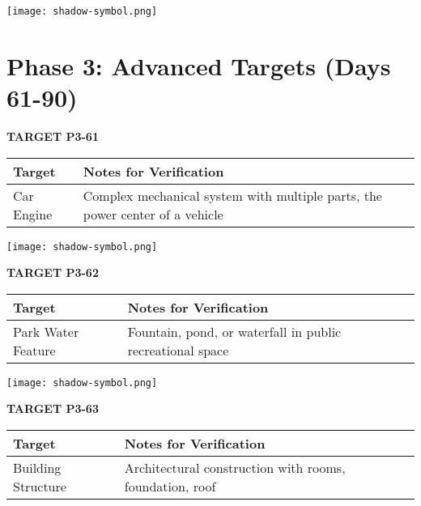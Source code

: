 \documentclass[10pt,twoside,final]{book} %
\makeatletter
\newcommand{\cleardoublepageWithSymbol}{%
  \clearpage %
  \if@twoside %
    \ifodd\c@page %
    \else %
      \thispagestyle{fancy} %
      \begingroup %
        \vspace*{0pt} %
        \vfill %
        \centering %
        \noindent 
        \texttt{[image: shadow-symbol.png]}
        \vfill %
      \endgroup
      \newpage    %
      \if@twocolumn\if@firstcolumn\else\hbox{}\newpage\fi\fi
    \fi
  \fi
}
\makeatother
\begin{document}
\cleardoublepageWithSymbol

\section*{Phase 3: Advanced Targets (Days 61-90)}

\label{target:P3-61}
\begin{center}
\Large\textbf{TARGET P3-61}
\end{center}
\begin{mdframed}[backgroundcolor=white, linewidth=0.7pt, linecolor=rvprimary, shadow=true, shadowsize=1pt, shadowcolor=graydark!40, roundcorner=3pt]
\begin{tabular}{|p{3.5cm}|p{9cm}|}
\hline
\rowcolor{rvprimary!15}
\textbf{Target} & \textbf{Notes for Verification} \\
\hline
Car Engine & Complex mechanical system with multiple parts, the power center of a vehicle \\
\hline
\end{tabular}
\end{mdframed}


\cleardoublepageWithSymbol
\label{target:P3-62}
\begin{center}
\Large\textbf{TARGET P3-62}
\end{center}
\begin{mdframed}[backgroundcolor=white, linewidth=0.7pt, linecolor=rvprimary, shadow=true, shadowsize=1pt, shadowcolor=graydark!40, roundcorner=3pt]
\begin{tabular}{|p{3.5cm}|p{9cm}|}
\hline
\rowcolor{rvprimary!15}
\textbf{Target} & \textbf{Notes for Verification} \\
\hline
Park Water Feature & Fountain, pond, or waterfall in public recreational space \\
\hline
\end{tabular}
\end{mdframed}


\cleardoublepageWithSymbol
\label{target:P3-63}
\begin{center}
\Large\textbf{TARGET P3-63}
\end{center}
\begin{mdframed}[backgroundcolor=white, linewidth=0.7pt, linecolor=rvprimary, shadow=true, shadowsize=1pt, shadowcolor=graydark!40, roundcorner=3pt]
\begin{tabular}{|p{3.5cm}|p{9cm}|}
\hline
\rowcolor{rvprimary!15}
\textbf{Target} & \textbf{Notes for Verification} \\
\hline
Building Structure & Architectural construction with rooms, foundation, roof \\
\hline
\end{tabular}
\end{mdframed}
\end{document}
